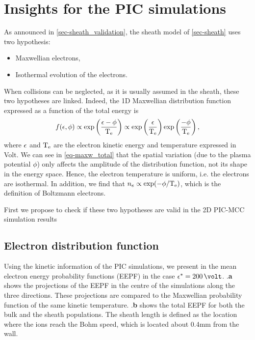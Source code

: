 


\section{Insights for the PIC simulations}
  \label{sec-insights}

  As announced in \cref{sec-sheath_validation}, the sheath model of \cref{sec-sheath} uses two hypothesis\string:
  \begin{itemize}
    \item Maxwellian electrons,
    \item Isothermal evolution of the electrons.
  \end{itemize}

  When collisions can be neglected, as it is usually assumed in the sheath, these two hypotheses are linked.
  Indeed, the \ac{1D} Maxwellian distribution function expressed as a function of the total energy is
  \begin{equation} \label{eq-maxw_total}
    f(\epsilon, \phi) \propto \exp \left( \frac{\epsilon - \phi}{\mathrm{T_e}}  \right)  \propto \exp \left( \frac{\epsilon}{\mathrm{T_e}} \right) \exp \left( \frac{-\phi}{\mathrm{T_e}} \right),
  \end{equation}
  where $\epsilon$ and $\mathrm{T_e}$ are the electron kinetic energy and temperature expressed in Volt.
  We can see in \cref{eq-maxw_total} that the spatial variation (due to the plasma potential $\phi$) only affects the amplitude of the distribution function, not its shape in the energy space.
  Hence, the electron temperature is uniform, i.e. the electrons are isothermal.
  In addition, we find that $n_e \propto \exp (- \phi / \mathrm{T_e})$, which is the definition of Boltzmann electrons.

  First we propose to check  if these two hypotheses are valid  in the \ac{2D} \ac{PIC}-\ac{MCC} simulation results

  \subsection{Electron distribution function}
    \label{subsec-eedf_2D}

    Using the kinetic information of the PIC simulations, we present in  the mean electron energy probability functions (EEPF) in the case $\crover = 200\,\volt$.
    .{\bf a} shows the projections of the EEPF in the centre of the simulations along the three directions.
    These projections are compared to the Maxwellian probability function of the same
    kinetic temperature.
    .{\bf b} shows the total EEPF for both the bulk and the sheath populations.
    The sheath length is defined as the location where the ions reach the Bohm speed, which is located about 0.4mm from the wall.
     
